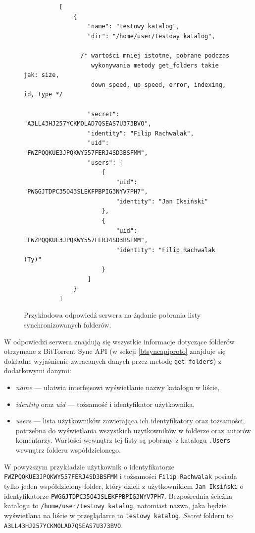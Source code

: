 \begin{figure}[htb!]
\label{newcommentrequest}
  \begin{verbatim}
          [
              {
                  "name": "testowy katalog", 
                  "dir": "/home/user/testowy katalog", 
              
                /* wartości mniej istotne, pobrane podczas
                   wykonywania metody get_folders takie jak: size,
                   down_speed, up_speed, error, indexing, id, type */
         
                  "secret": "A3LL43HJ257YCKMOLAD7QSEAS7U373BVO", 
                  "identity": "Filip Rachwalak", 
                  "uid": "FWZPQQKUE3JPQKWY557FERJ4SD3BSFMM", 
                  "users": [
                      {
                          "uid": "PWGGJTDPC35O43SLEKFPBPIG3NYV7PH7", 
                          "identity": "Jan Iksiński"
                      }, 
                      {
                          "uid": "FWZPQQKUE3JPQKWY557FERJ4SD3BSFMM", 
                          "identity": "Filip Rachwalak (Ty)"
                      }
                  ]
              }
          ]
  \end{verbatim}
  \caption{Przykładowa odpowiedź serwera na żądanie pobrania listy synchronizowanych folderów.}
\end{figure}

W odpowiedzi serwera znajdują się wszystkie informacje dotyczące folderów otrzymane z BitTorrent Sync API (w sekcji \ref{btsyncapiproto} znajduje się dokładne wyjaśnienie zwracanych danych przez metodę \texttt{get\_folders}) z dodatkowymi danymi:

\begin{itemize}[noitemsep]
  \item \emph{name} --- ułatwia interfejsowi wyświetlanie nazwy katalogu w liście,
  
  \item \emph{identity} oraz \emph{uid} --- tożsamość i identyfikator użytkownika,
  
  \item \emph{users} --- lista użytkowników zawierająca ich identyfikatory oraz tożsamości, potrzebna do wyświetlania wszystkich użytkowników w folderze oraz autorów komentarzy. Wartości wewnątrz tej listy są pobrany z katalogu \texttt{.Users} wewnątrz folderu współdzielonego.
\end{itemize}

W powyższym przykładzie użytkownik o identyfikatorze \texttt{FWZPQQKU\-E3JPQKWY\-557FERJ4\-SD3BSFMM} i tożsamości \texttt{Filip Rachwalak} posiada tylko jeden współdzielony folder, który dzieli z użytkownikiem \texttt{Jan Iksiński} o identyfikatorze \texttt{PWGGJTDP\-C35O43SL\-EKFPBPIG3\-NYV7PH7}. Bezpośrednia ścieżka katalogu to \texttt{/home/user/\-testowy katalog}, natomiast nazwa, jaka będzie wyświetlana na liście w przeglądarce to \texttt{testowy katalog}. \emph{Secret} folderu to \texttt{A3LL43HJ2\-57YCKMOL\-AD7QSEAS7\-U373BVO}.

